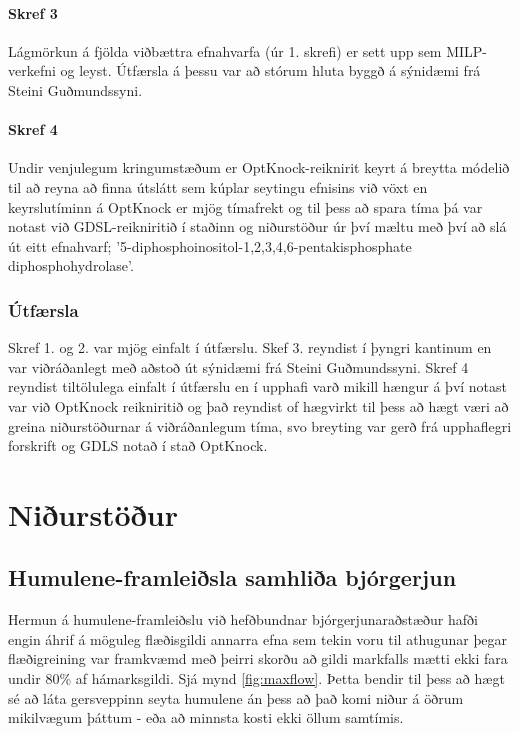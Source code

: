 \documentclass[11pt]{article}
\begin{document}
\begin{multicols}{2}
\paragraph{Skref 3}
Lágmörkun á fjölda viðbættra efnahvarfa (úr 1. skrefi) er sett upp sem MILP-verkefni og leyst. Útfærsla á þessu var að stórum hluta byggð á sýnidæmi frá Steini Guðmundssyni.

\paragraph{Skref 4}
Undir venjulegum kringumstæðum er OptKnock-reiknirit keyrt á breytta módelið til að reyna að finna útslátt sem kúplar seytingu efnisins við vöxt en keyrslutíminn á OptKnock er mjög tímafrekt og til þess að spara tíma þá var notast við GDSL\cite{lun2009large}-reikniritið í staðinn og niðurstöður úr því mæltu með því að slá út eitt efnahvarf; '5-diphosphoinositol-1,2,3,4,6-pentakisphosphate diphosphohydrolase'.

\subsubsection{Útfærsla}
Skref 1. og 2. var mjög einfalt í útfærslu. Skef 3. reyndist í þyngri kantinum en var viðráðanlegt með aðstoð út sýnidæmi frá Steini Guðmundssyni. Skref 4 reyndist tiltölulega einfalt í útfærslu en í upphafi varð mikill hængur á því notast var við OptKnock reikniritið og það reyndist of hægvirkt til þess að hægt væri að greina niðurstöðurnar á viðráðanlegum tíma, svo breyting var gerð frá upphaflegri forskrift og GDLS \cite{lun2009large} notað í stað OptKnock.

\section{Niðurstöður}
\subsection{Humulene-framleiðsla samhliða bjórgerjun}
Hermun á humulene-framleiðslu við hefðbundnar bjórgerjunaraðstæður hafði engin áhrif á möguleg flæðisgildi annarra efna sem tekin voru til athugunar þegar flæðigreining var framkvæmd með þeirri skorðu að gildi markfalls mætti ekki fara undir 80\% af hámarksgildi. Sjá mynd \ref{fig:maxflow}. Þetta bendir til þess að hægt sé að láta gersveppinn seyta humulene án þess að það komi niður á öðrum mikilvægum þáttum - eða að minnsta kosti ekki öllum samtímis.


\end{multicols}
\end{document}
